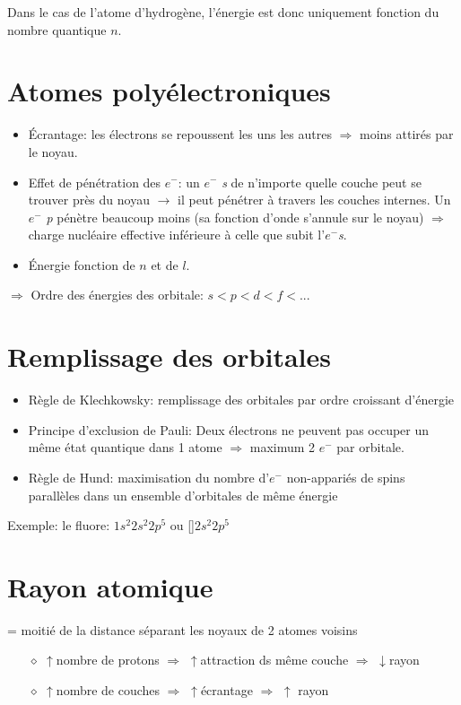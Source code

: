 \documentclass[11pt,a4paper,french]{article}
\begin{document}
Dans le cas de l'atome d'hydrogène, l'énergie est donc uniquement fonction du nombre quantique $n$.

\section{Atomes polyélectroniques}
\begin{itemize}
	\item \'Ecrantage: les électrons se repoussent les uns les autres $\Rightarrow$ moins attirés par le noyau.
	\item Effet de pénétration des $e^-$: un $e^-$ \textit{s} de n'importe quelle couche peut se trouver près du noyau $\rightarrow$ il peut pénétrer à travers les couches internes.
		Un $e^-$ \textit{p} pénètre beaucoup moins (sa fonction d'onde s'annule sur le noyau) $\Rightarrow$ charge nucléaire effective inférieure à celle que subit l'$e^-$\textit{s}.
	\item \'Energie fonction de $n$ et de $l$.
\end{itemize}
$\Rightarrow$ Ordre des énergies des orbitale: $s<p<d<f<...$

\section{Remplissage des orbitales}
\begin{itemize}
	\item Règle de Klechkowsky: remplissage des orbitales par ordre croissant d'énergie
	\item Principe d'exclusion de Pauli: Deux électrons ne peuvent pas occuper un même état quantique dans 1 atome $\Rightarrow$ maximum 2 $e^-$ par orbitale.
	\item Règle de Hund: maximisation du nombre d'$e^-$ non-appariés de spins parallèles dans un ensemble d'orbitales de même énergie\\
\end{itemize}

Exemple: le fluore:  $1s^2 2s^2 2p^5$ ou []$2s^2 2p^5$


\section{Rayon atomique} = moitié de la distance séparant les noyaux de 2 atomes voisins
\begin{itemize}
	\item[$\diamond$]$\uparrow$nombre de protons $\Rightarrow$ $\uparrow$attraction ds même couche $\Rightarrow$  $\downarrow$rayon
	\item[$\diamond$]$\uparrow$nombre de couches $\Rightarrow$ $\uparrow$écrantage $\Rightarrow$ $\uparrow$ rayon
\end{itemize}
\end{document}
